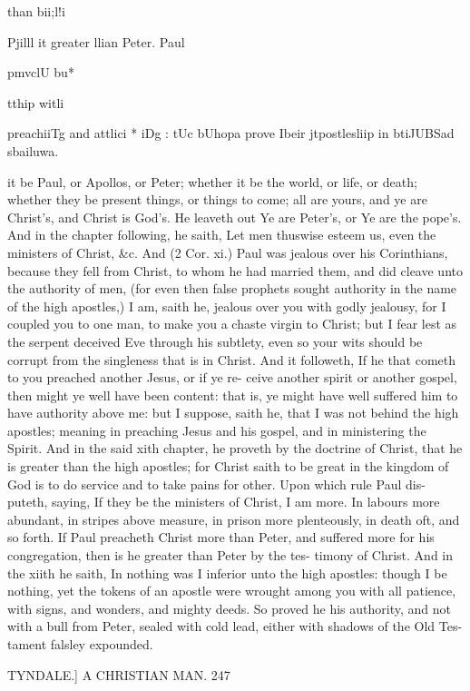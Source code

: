 \documentclass{custom}
\begin{document}
{than bii;l!i 

Pjilll it 
greater 
llian Peter. 
Paul 

pmvclU bu* 

tthip witli 

preachiiTg 
and attlici * 
iDg : tUc 
bUhopa 
prove Ibeir 
jtpostlesliip 
in btiJUBSad 
sbailuwa. 

it be Paul, or Apollos, or Peter; whether it be the world, 
or life, or death; whether they be present things, or things 
to come; all are yours, and ye are Christ's, and 
Christ is God's. He leaveth out Ye are Peter's, or Ye are 
the pope's. And in the chapter following, he saith, Let men 
thuswise esteem us, even the ministers of Christ, &c. And 
(2 Cor. xi.) Paul was jealous over his Corinthians, because 
they fell from Christ, to whom he had married them, and 
did cleave unto the authority of men, (for even then false 
prophets sought authority in the name of the high apostles,) 
I am, saith he, jealous over you with godly jealousy, for I 
coupled you to one man, to make you a chaste virgin to 
Christ; but I fear lest as the serpent deceived Eve 
through his subtlety, even so your wits should be corrupt 
from the singleness that is in Christ. And it followeth, If 
he that cometh to you preached another Jesus, or if ye re- 
ceive another spirit or another gospel, then might ye well 
have been content: that is, ye might have well suffered him 
to have authority above me: but I suppose, saith he, that 
I was not behind the high apostles; meaning in preaching 
Jesus and his gospel, and in ministering the Spirit. And 
in the said xith chapter, he proveth by the doctrine of 
Christ, that he is greater than the high apostles; for Christ 
saith to be great in the kingdom of God is to do service 
and to take pains for other. Upon which rule Paul dis- 
puteth, saying, If they be the ministers of Christ, I am more. 
In labours more abundant, in stripes above measure, in 
prison more plenteously, in death oft, and so forth. If Paul 
preacheth Christ more than Peter, and suffered more for 
his congregation, then is he greater than Peter by the tes- 
timony of Christ. And in the xiith he saith, In nothing was 
I inferior unto the high apostles: though I be nothing, yet 
the tokens of an apostle were wrought among you with all 
patience, with signs, and wonders, and mighty deeds. So 
proved he his authority, and not with a bull from Peter, 
sealed with cold lead, either with shadows of the Old Tes- 
tament falsley expounded. 


TYNDALE.]
A CHRISTIAN MAN.
247

}
\end{document}
